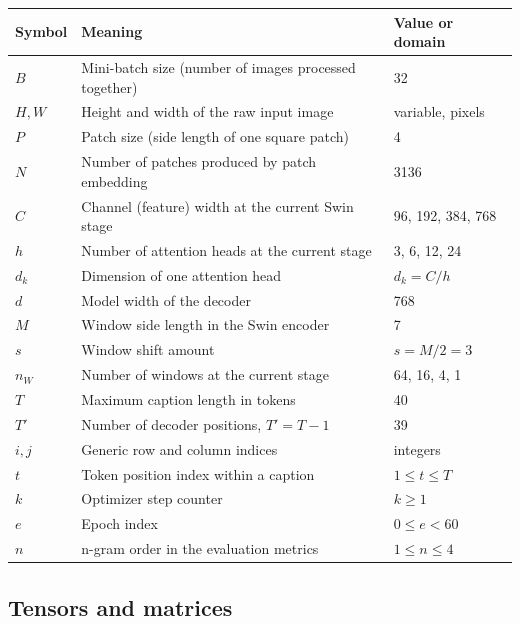 \documentclass[12pt]{article}
\begin{document}
\begin{center}
\begin{tabular}{@{}lL{7cm}l@{}}
\toprule
Symbol & Meaning & Value or domain \\
\midrule
$B$ & Mini-batch size (number of images processed together) & 32 \\
$H, W$ & Height and width of the raw input image & variable, pixels \\
$P$ & Patch size (side length of one square patch) & 4 \\
$N$ & Number of patches produced by patch embedding & 3136 \\
$C$ & Channel (feature) width at the current Swin stage & 96, 192, 384, 768 \\
$h$ & Number of attention heads at the current stage & 3, 6, 12, 24 \\
$d_k$ & Dimension of one attention head & $d_k = C/h$ \\
$d$ & Model width of the decoder & 768 \\
$M$ & Window side length in the Swin encoder & 7 \\
$s$ & Window shift amount & $s = M/2 = 3$ \\
$n_W$ & Number of windows at the current stage & 64, 16, 4, 1 \\
$T$ & Maximum caption length in tokens & 40 \\
$T'$ & Number of decoder positions, $T' = T - 1$ & 39 \\
$i, j$ & Generic row and column indices & integers \\
$t$ & Token position index within a caption & $1 \le t \le T$ \\
$k$ & Optimizer step counter & $k \ge 1$ \\
$e$ & Epoch index & $0 \le e < 60$ \\
$n$ & n-gram order in the evaluation metrics & $1 \le n \le 4$ \\
\bottomrule
\end{tabular}
\end{center}

\subsection{Tensors and matrices}
\end{document}
